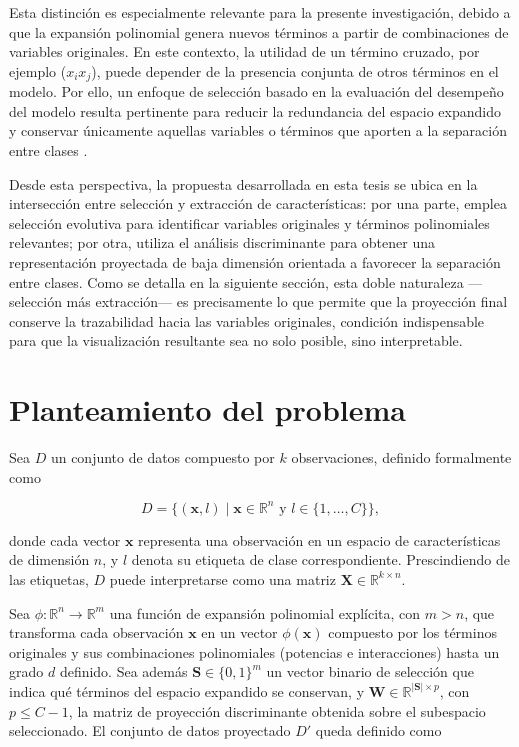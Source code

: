 	Esta distinción es especialmente relevante para la presente investigación, debido a que la expansión polinomial genera nuevos términos a partir de combinaciones de variables originales. En este contexto, la utilidad de un término cruzado, por ejemplo ($x_ix_j$), puede depender de la presencia conjunta de otros términos en el modelo. Por ello, un enfoque de selección basado en la evaluación del desempeño del modelo resulta pertinente para reducir la redundancia del espacio expandido y conservar únicamente aquellas variables o términos que aporten a la separación entre clases \cite{kohavi1997wrappers}.
	
	Desde esta perspectiva, la propuesta desarrollada en esta tesis se ubica en la intersección entre selección y extracción de características: por una parte, emplea selección evolutiva para identificar variables originales y términos polinomiales relevantes; por otra, utiliza el análisis discriminante para obtener una representación proyectada de baja dimensión orientada a favorecer la separación entre clases. Como se detalla en la siguiente sección, esta doble naturaleza —selección más extracción— es precisamente lo que permite que la proyección final conserve la trazabilidad hacia las variables originales, condición indispensable para que la visualización resultante sea no solo posible, sino interpretable.
	
	\section{Planteamiento del problema}
	\label{sec:Planteamiento-Problema}
	
	Sea $D$ un conjunto de datos compuesto por $k$ observaciones, definido formalmente como
	
	\begin{equation}
		D = \{(\mathbf{x}, l) \mid \mathbf{x} \in \mathbb{R}^n \text{ y } l \in \{1, \dots, C\}\},
	\end{equation}
	
	\noindent donde cada vector $\mathbf{x}$ representa una observación en un espacio de características de dimensión $n$, y $l$ denota su etiqueta de clase correspondiente. Prescindiendo de las etiquetas, $D$ puede interpretarse como una matriz $\mathbf{X} \in \mathbb{R}^{k \times n}$.
	
	Sea $\phi: \mathbb{R}^n \rightarrow \mathbb{R}^m$ una función de expansión polinomial explícita, con $m > n$, que transforma cada observación $\mathbf{x}$ en un vector $\phi(\mathbf{x})$ compuesto por los términos originales y sus combinaciones polinomiales (potencias e interacciones) hasta un grado $d$ definido. Sea además $\mathbf{S} \in \{0,1\}^{m}$ un vector binario de selección que indica qué términos del espacio expandido se conservan, y $\mathbf{W} \in \mathbb{R}^{|\mathbf{S}| \times p}$, con $p \leq C-1$, la matriz de proyección discriminante obtenida sobre el subespacio seleccionado. El conjunto de datos proyectado $D'$ queda definido como
	
